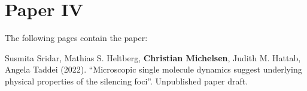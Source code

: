 
\chapter{Paper IV}
\label{chapter:diffusion}

The following pages contain the paper:
\vspace*{1cm}


Susmita Sridar, Mathias S. Heltberg, \textbf{Christian Michelsen}, Judith M. Hattab, Angela Taddei (2022). ``Microscopic single molecule dynamics suggest underlying physical properties of the silencing foci''. Unpublished paper draft.

\clearpage
